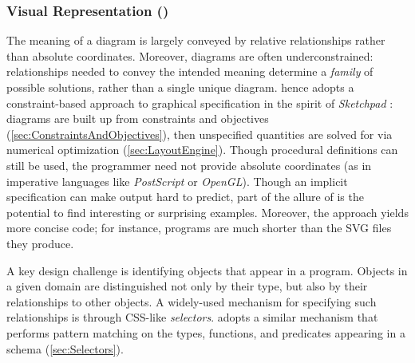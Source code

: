 \subsubsection{Visual Representation (\Style{})}
\label{sec:MathematicalVisualization}


The meaning of a diagram is largely conveyed by relative relationships rather than absolute coordinates.  Moreover, diagrams are often underconstrained: relationships needed to convey the intended meaning determine a \emph{family} of possible solutions, rather than a single unique diagram.  \Style{} hence adopts a constraint-based approach to graphical specification in the spirit of \emph{Sketchpad} \cite{sketchpad}: diagrams are built up from constraints and objectives (\cref{sec:ConstraintsAndObjectives}), then unspecified quantities are solved for via numerical optimization (\cref{sec:LayoutEngine}).  Though procedural definitions can still be used, the programmer need not provide absolute coordinates (as in imperative languages like \emph{PostScript} or \emph{OpenGL}).  Though an implicit specification can make output hard to predict, part of the allure of \Penrose{} is the potential to find interesting or surprising examples.  Moreover, the approach yields more concise code; for instance, \Style{} programs are much shorter than the SVG files they produce.


A key design challenge is identifying objects that appear in a \Substance{} program.  Objects in a given domain are distinguished not only by their type, but also by their relationships to other objects.  A widely-used mechanism for specifying such relationships is through CSS-like \emph{selectors}. \Style{} adopts a similar mechanism that performs pattern matching on the types, functions, and predicates appearing in a \Domain{} schema (\cref{sec:Selectors}).


